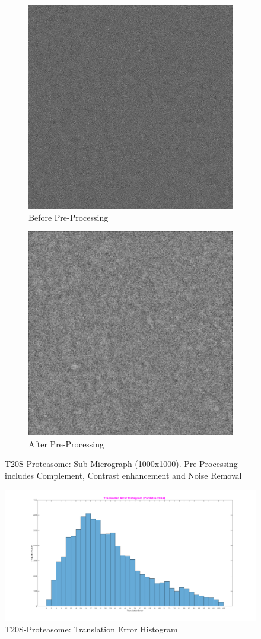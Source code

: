 \documentclass{report}
\begin{document}
\begin{figure}[H]
\centering
\begin{subfigure}{.5\linewidth}
\centering
\includegraphics[width=0.5\linewidth]{fasterrcnn-input-no-prepocess.jpg}
\captionsetup{justification=centering}
\caption{ Before Pre-Processing}
\end{subfigure} 
\begin{subfigure}{.48\linewidth}
\centering
\includegraphics[width=0.5\linewidth]{fasterrcnn-input-with-prepocess.jpg}
\captionsetup{justification=centering}
\caption{ After Pre-Processing}
\end{subfigure}
\captionsetup{justification=centering}
\caption{ T20S-Proteasome: Sub-Micrograph (1000x1000). Pre-Processing includes Complement, Contrast enhancement and Noise Removal}
\label{fig: fasterrcnn-inputimage}
\end{figure}

\begin{figure}[h]
\centering
\includegraphics[width=0.68\linewidth]{fasterrcnn-EM10025-Translation_Error_Histogram.png}
\captionsetup{justification=centering}
\caption{ T20S-Proteasome: Translation Error Histogram}
\label{fig: fasterrcnn-T20S-Proteasome-Translation_Error_Histogram}
\end{figure}
\end{document}
